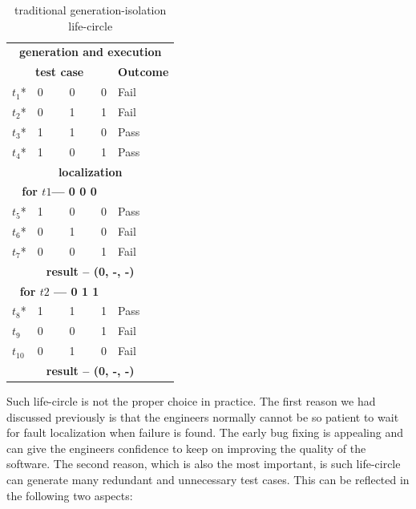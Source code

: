\documentclass{sig-alternate}
\begin{document}
\begin{table}[h]
\caption{traditional generation-isolation life-circle}
\label{tradition-gi}
\center
\begin{tabular}{llllll}
\multicolumn{6}{c}{\bfseries generation and execution} \\
\multicolumn{5}{c}{\bfseries test case} & \bfseries Outcome \\
 $t_{1}$* & \multicolumn{4}{l}{0 \ \ \ \ 0 \ \ \ \  0 } & Fail \\
 $t_{2}$* & \multicolumn{4}{l}{0 \ \ \ \ 1 \ \ \ \  1 } & Fail \\
 $t_{3}$* & \multicolumn{4}{l}{1 \ \ \ \ 1 \ \ \ \  0 } & Pass \\
 $t_{4}$* & \multicolumn{4}{l}{1 \ \ \ \ 0 \ \ \ \  1 } & Pass \\
 \hline
\multicolumn{6}{c}{\bfseries localization}  \\
\multicolumn{5}{c}{\bfseries for $t1$--- 0 0 0} &  \\
$t_{5}$* &\multicolumn{4}{l}{1  \ \ \ \  0 \ \ \ \  0 }& Pass \\
$t_{6}$* &\multicolumn{4}{l}{0  \ \ \ \  1 \ \ \ \  0 } & Fail \\
$t_{7}$* &\multicolumn{4}{l}{0  \ \ \ \  0 \ \ \ \  1 } & Fail \\
\multicolumn{6}{c}{\bfseries result --  (0, -, -)}  \\
\multicolumn{5}{c}{\bfseries for $t2$ --- 0 1 1} &  \\
$t_{8}$* &\multicolumn{4}{l}{1  \ \ \ \  1 \ \ \ \  1 }& Pass \\
$t_{9}$ &\multicolumn{4}{l}{0  \ \ \ \  0 \ \ \ \  1 } & Fail \\
$t_{10}$ &\multicolumn{4}{l}{0  \ \ \ \  1 \ \ \ \  0 } & Fail \\
\multicolumn{6}{c}{\bfseries result --  (0, -, -)}  \\
\end{tabular}
\end{table}

Such life-circle is not the proper choice in practice. The first reason we had discussed previously is that the engineers normally cannot be so patient to wait for fault localization when failure is found. The early bug fixing is appealing and can give the engineers confidence to keep on improving the quality of the software. The second reason, which is also the most important, is such life-circle can generate many redundant and unnecessary test cases. This can be reflected in the following two aspects:
\end{document}
